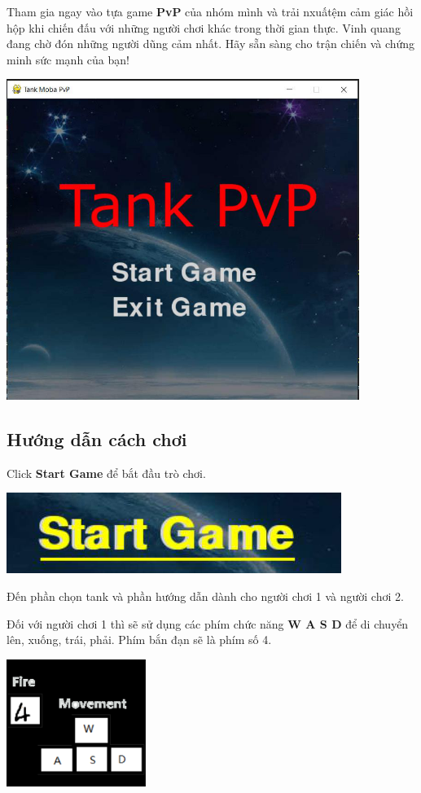 \documentclass[a4paper]{article}
\begin{document}
Tham gia ngay vào tựa game \textbf{PvP} của nhóm mình và trải nxuấtệm
cảm giác hồi hộp khi chiến đấu với những người chơi khác trong thời gian
thực. Vinh quang đang chờ đón những người dũng cảm nhất. Hãy sẵn sàng
cho trận chiến và chứng minh sức mạnh của bạn!

\includegraphics[width=4.50833in,height=4.1in]{image16.png}
\subsection{Hướng dẫn cách chơi}
Click \textbf{Start Game} để bắt đầu trò chơi.

\includegraphics[width=4.28056in,height=1.03194in]{image17.png}

Đến phần chọn tank và phần hướng dẫn dành cho người chơi 1 và người chơi 2.

Đối với người chơi 1 thì sẽ sử dụng các phím chức năng \textbf{W A S D}
để di chuyển lên, xuống, trái, phải. Phím bắn đạn sẽ là phím số 4.

\includegraphics[width=1.77778in,height=1.625in]{image18.png}
\end{document}

